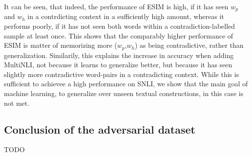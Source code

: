 It can be seen, that indeed, the performance of \ac{ESIM} is high, if it has seen $w_p$ and $w_h$ in a contrdicting context in a sufficiently high amount, whereas it performs poorly, if it has not seen both words within a contradiction-labelled sample at least once. This shows that the comparably higher performance of ESIM is matter of memorizing more ($w_p$,$w_h$) as being contradictive, rather than generalization. Similarily, this explains the increase in accuracy when adding \ac{MultiNLI}, not because it learns to generalize better, but because it has seen slightly more contradictive word-pairs in a contradicting context. While this is sufficient to achievee a high performance on \ac{SNLI}, we show that the main goal of machine learning, to generalize over unseen textual constructions, in this case is not met. 

\subsection{Conclusion of the adversarial dataset}
TODO